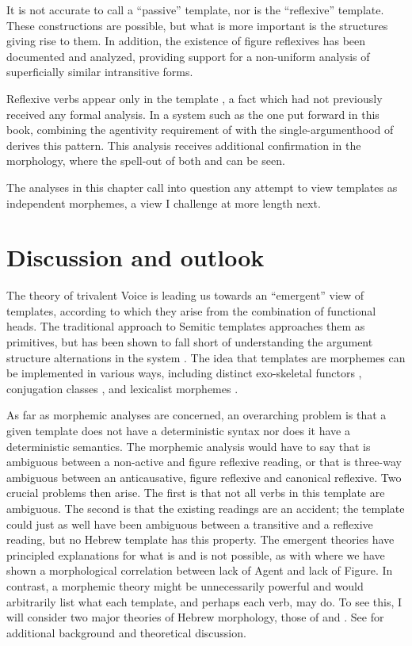 It is not accurate to call {\tnif} a ``passive'' template, nor is {\thit} the ``reflexive'' template. These constructions are possible, but what is more important is the structures giving rise to them. In addition, the existence of figure reflexives has been documented and analyzed, providing support for a non-uniform analysis of superficially similar intransitive forms.

Reflexive verbs appear only in the template {\thit}, a fact which had not previously received any formal analysis. In a system such as the one put forward in this book, combining the agentivity requirement of {\va} with the single-argumenthood of {\vz} derives this pattern. This analysis receives additional confirmation in the morphology, where the spell-out of both {\va} and {\vz} can be seen.

The analyses in this chapter call into question any attempt to view templates as independent morphemes, a view I challenge at more length next.


\section{Discussion and outlook} \label{vz:others}
The theory of trivalent Voice is leading us towards an ``emergent'' view of templates, according to which they arise from the combination of functional heads. The traditional approach to Semitic templates approaches them as primitives, but has been shown to fall short of understanding the argument structure alternations in the system \citep{doron03,kastner16phd,kastner17gjgl,kastner18nllt}. The idea that templates are morphemes can be implemented in various ways, including distinct exo-skeletal functors \citep{borer13oup}, conjugation classes \citep{arad05,aronoff07}, and lexicalist morphemes \citep{reinhartsiloni05,laks11,laks14}.

As far as morphemic analyses are concerned, an overarching problem is that a given template does not have a deterministic syntax nor does it have a deterministic semantics. The morphemic analysis would have to say that {\tnif} is ambiguous between a non-active and figure reflexive reading, or that {\thit} is three-way ambiguous between an anticausative, figure reflexive and canonical reflexive. Two crucial problems then arise. The first is that not all verbs in this template are ambiguous. The second is that the existing readings are an accident; the template could just as well have been ambiguous between a transitive and a reflexive reading, but no Hebrew template has this property. The emergent theories have principled explanations for what is and is not possible, as with {\tnif} where we have shown a morphological correlation between lack of Agent and lack of Figure. In contrast, a morphemic theory might be unnecessarily powerful and would arbitrarily list what each template, and perhaps each verb, may do. To see this, I will consider two major theories of Hebrew morphology, those of \cite{doron03,doron13voice} and \cite{arad03,arad05}. See \cite{kastnertucker19cup} for additional background and theoretical discussion.


